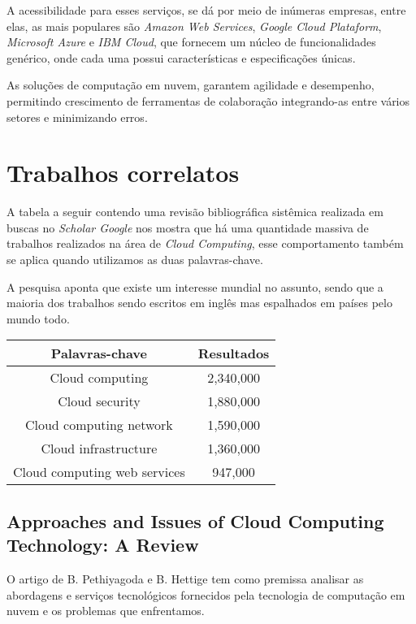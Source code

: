 \documentclass[12pt]{article}
\begin{document}
A acessibilidade para esses serviços, se dá por meio de inúmeras empresas, entre elas, as mais populares são \emph{Amazon Web Services}, \emph{Google Cloud Plataform}, \emph{Microsoft Azure} e \emph{IBM Cloud}, que fornecem um núcleo de funcionalidades genérico, onde cada uma possui características e especificações únicas.

As soluções de computação em nuvem, garantem agilidade e desempenho, permitindo crescimento de ferramentas de colaboração integrando-as entre vários setores e minimizando erros.

\section{Trabalhos correlatos}

A tabela a seguir contendo uma revisão bibliográfica sistêmica realizada em buscas no \emph{Scholar Google} nos mostra que há uma quantidade massiva de trabalhos realizados na área de \emph{Cloud Computing}, esse comportamento também se aplica quando utilizamos as duas palavras-chave.

A pesquisa aponta que existe um interesse mundial no assunto, sendo que a maioria dos trabalhos sendo escritos em inglês mas espalhados em países pelo mundo todo.

\begin{center}
    \begin{tabular}{ | c | c | }
    \hline
    Palavras-chave & Resultados \\ 
    \hline
    Cloud computing & 2,340,000 \\  
    \hline
    Cloud security & 1,880,000 \\
    \hline
    Cloud computing network & 1,590,000 \\
    \hline
    Cloud infrastructure & 1,360,000 \\
    \hline
    Cloud computing web services & 947,000 \\
    \hline
    \end{tabular}
\end{center}

\subsection{Approaches and Issues of Cloud Computing Technology: A Review \cite{pethi}}

O artigo de B. Pethiyagoda e B. Hettige tem como premissa analisar as abordagens e serviços tecnológicos fornecidos pela tecnologia de computação em nuvem e os problemas que enfrentamos.
\end{document}
